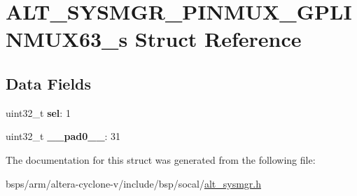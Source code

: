 \hypertarget{structALT__SYSMGR__PINMUX__GPLINMUX63__s}{}\section{A\+L\+T\+\_\+\+S\+Y\+S\+M\+G\+R\+\_\+\+P\+I\+N\+M\+U\+X\+\_\+\+G\+P\+L\+I\+N\+M\+U\+X63\+\_\+s Struct Reference}
\label{structALT__SYSMGR__PINMUX__GPLINMUX63__s}
\subsection*{Data Fields}
\begin{DoxyCompactItemize}
\item 
\mbox{\label{structALT__SYSMGR__PINMUX__GPLINMUX63__s_a6a17af848f0a80c33639b32f88c1c95e}} 
uint32\+\_\+t {\bfseries sel}\+: 1
\item 
\mbox{\label{structALT__SYSMGR__PINMUX__GPLINMUX63__s_a199e8f013da64f541654d714dc6150ab}} 
uint32\+\_\+t {\bfseries \+\_\+\+\_\+pad0\+\_\+\+\_\+}\+: 31
\end{DoxyCompactItemize}


The documentation for this struct was generated from the following file\+:\begin{DoxyCompactItemize}
\item 
bsps/arm/altera-\/cyclone-\/v/include/bsp/socal/\mbox{\hyperlink{alt__sysmgr_8h}{alt\+\_\+sysmgr.\+h}}\end{DoxyCompactItemize}
